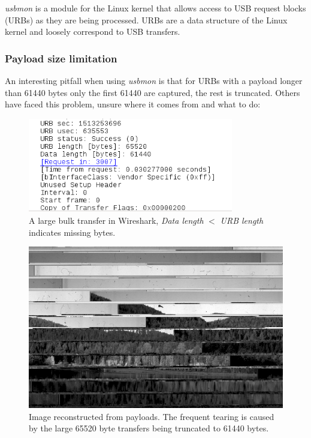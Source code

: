 \documentclass{article}
\begin{document}
{\it usbmon} is a module for the Linux kernel that allows access to
USB request blocks (URBs) as they are being processed. URBs are a
data structure of the Linux kernel and loosely correspond to USB transfers. \cite{usbmon}

\subsubsection{Payload size limitation}

An interesting pitfall when using {\it usbmon} is that for URBs with a payload
longer than 61440 bytes only the first 61440 are captured, the rest is truncated.
Others have faced this problem, unsure where it comes from and what to do: \cite{usbmon_others}

\begin{figure}[H]
  \caption{A large bulk transfer in Wireshark, {\it Data length} $<$ {\it URB length}
           indicates missing bytes.}
  \centering
  \includegraphics[width=0.8\textwidth]{images/usbmon_missing.png}
\end{figure}

\begin{figure}[H]
  \caption{Image reconstructed from payloads. The frequent tearing is caused by the large
  65520 byte transfers being truncated to 61440 bytes.}
  \centering
  \includegraphics[width=\textwidth]{images/reconstruct_missing.jpg}
\end{figure}
\end{document}

